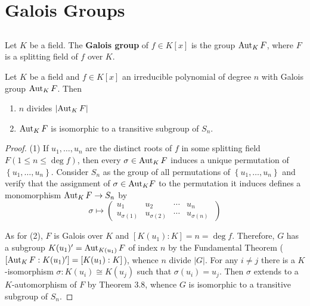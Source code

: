















\section{Galois Groups}%
\subsection{}
\begin{definition}
    Let $K$ be a field. The \textbf{Galois group} of $ f  \in K[ x ]$ is the group $\operatorname{\operatorname{Aut}}_K F$, where $F$ is a splitting field of $f$ over $K$.
\end{definition}

\begin{theorem}
    Let $K$ be a field and $f\in K[x]$ an irreducible polynomial of degree $n$ with Galois group $\operatorname{\operatorname{Aut}}_K F$. Then
    \begin{enumerate}
        \item
              $n$ divides $\left|\operatorname{\operatorname{Aut}}_K F\right|$
        \item
              $\operatorname{\operatorname{Aut}}_K F$ is isomorphic to a transitive subgroup of $S_n$.
    \end{enumerate}
    \begin{proof}
        (1) If $u_1, \ldots, u_n$ are the distinct roots of $f$ in some splitting field $F(1 \leq n \leq \deg f)$, then every $\sigma \in \operatorname{\operatorname{Aut}}_K F$ induces a unique permutation of $\left\{u_1, \ldots, u_n\right\}$.
        Consider $S_n$ as the group of all permutations of $\left\{u_1, \ldots, u_n\right\}$ and verify that the assignment of $\sigma \in {\operatorname{\operatorname{Aut}}}_K F$ to the permutation it induces defines a monomorphism $\operatorname{\operatorname{Aut}}_K F \rightarrow S_n$ by
        \begin{equation*}
            \sigma \mapsto \left(\begin{matrix}
                u_1           & u_2           & \cdots & u_n            \\
                u_{\sigma(1)} & u_{\sigma(2)} & \cdots & u_{\sigma(n)}\
            \end{matrix}\right)
        \end{equation*}

        As for (2), $F$ is Galois over $K$ and $\left[K\left(u_1\right): K\right]=n=\deg f$.
        Therefore, $G$ has a subgroup $K(u_1)'=\operatorname{\operatorname{Aut}}_{K(u_1)} F$ of index $n$ by the Fundamental Theorem ($\left[\operatorname{\operatorname{Aut}}_K F:K(u_1)'\right]=\left[K(u_1):K\right]$), whence $n$ divide $\left|G\right|$.
        For any $i \neq j$ there is a $K$-isomorphism $\sigma: K\left(u_i\right) \cong K\left(u_j\right)$ such that $\sigma\left(u_i\right)=u_j$.
        Then $\sigma$ extends to a $K$-automorphism of $F$ by Theorem 3.8, whence $G$ is isomorphic to a transitive subgroup of $S_n$.
    \end{proof}
\end{theorem}


